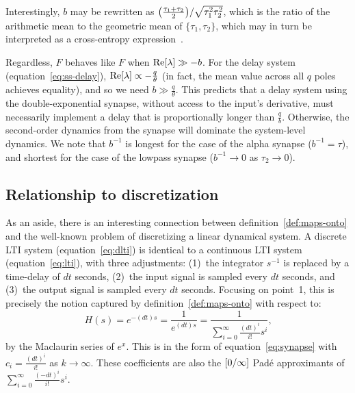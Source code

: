 \documentclass[12pt]{article}
\theoremstyle{definition}
\let\originalleft\left
\let\originalright\right
\renewcommand{\left}{\mathopen{}\mathclose\bgroup\originalleft}
\renewcommand{\right}{\aftergroup\egroup\originalright}
\begin{document}
Interestingly, $b$ may be rewritten as $\left( \frac{ \tau_1 + \tau_2}{2} \right) / \sqrt{\tau_1^2 \tau_2^2}$, which is the ratio of the arithmetic mean to the geometric mean of $\{\tau_1, \tau_2\}$, which may in turn be interpreted as a cross-entropy expression~\citep{woodhouse2001ratio}.

Regardless, $\hat{F}$ behaves like $F$ when $\text{Re} \left[ \lambda \right] \gg -b$.
For the delay system (equation~\ref{eq:ss-delay}), $\text{Re} \left[ \lambda \right] \propto -\frac{q}{\theta}$ (in fact, the mean value across all $q$ poles achieves equality), and so we need $b \gg \frac{q}{\theta}$.
This predicts that a delay system using the double-exponential synapse, without access to the input's derivative, must necessarily implement a delay that is proportionally longer than $\frac{q}{b}$.
Otherwise, the second-order dynamics from the synapse will dominate the system-level dynamics.
We note that $b^{-1}$ is longest for the case of the alpha synapse ($b^{-1} = \tau$), and shortest for the case of the lowpass synapse ($b^{-1} \rightarrow 0$ as $\tau_2 \rightarrow 0$).

\subsection{Relationship to discretization}
\label{app:discrete-connection}

As an aside, there is an interesting connection between definition~\ref{def:maps-onto} and the well-known problem of discretizing a linear dynamical system.
A discrete LTI system (equation~\ref{eq:dlti}) is identical to a continuous LTI system (equation~\ref{eq:lti}), with three adjustments: (1)~the integrator $s^{-1}$ is replaced by a time-delay of $dt$ seconds, (2)~the input signal is sampled every $dt$ seconds, and (3)~the output signal is sampled every $dt$ seconds.
Focusing on point~1, this is precisely the notion captured by definition~\ref{def:maps-onto} with respect to:
\begin{equation*}
H(s) = e^{-(dt)s} = \frac{1}{e^{(dt)s}} = \frac{1}{\sum_{i=0}^\infty \frac{(dt)^i}{i!} s^i} \text{,}
\end{equation*}
by the Maclaurin series of $e^{x}$.
This is in the form of equation~\ref{eq:synapse} with $c_i = \frac{(dt)^i}{i!}$ as $k \rightarrow \infty$.
These coefficients are also the $\left[ 0 / \infty \right]$ Pad\'e approximants of $\sum_{i=0}^\infty \frac{(-dt)^i}{i!} s^i$.
\end{document}
